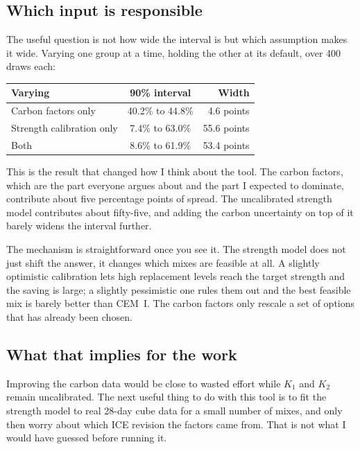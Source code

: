 \documentclass[11pt,a4paper]{article}
\begin{document}
\subsection{Which input is responsible}

The useful question is not how wide the interval is but which assumption makes it wide. Varying
one group at a time, holding the other at its default, over 400 draws each:

\begin{center}
\begin{tabular}{lcr}
\toprule
\textbf{Varying} & \textbf{90\% interval} & \textbf{Width} \\
\midrule
Carbon factors only       & 40.2\% to 44.8\% & 4.6 points \\
Strength calibration only & \phantom{0}7.4\% to 63.0\% & 55.6 points \\
Both                      & \phantom{0}8.6\% to 61.9\% & 53.4 points \\
\bottomrule
\end{tabular}
\end{center}

This is the result that changed how I think about the tool. The carbon factors, which are the
part everyone argues about and the part I expected to dominate, contribute about five percentage
points of spread. The uncalibrated strength model contributes about fifty-five, and adding the
carbon uncertainty on top of it barely widens the interval further.

The mechanism is straightforward once you see it. The strength model does not just shift the
answer, it changes which mixes are feasible at all. A slightly optimistic calibration lets high
replacement levels reach the target strength and the saving is large; a slightly pessimistic one
rules them out and the best feasible mix is barely better than CEM~I. The carbon factors only
rescale a set of options that has already been chosen.

\subsection{What that implies for the work}

Improving the carbon data would be close to wasted effort while $K_1$ and $K_2$ remain
uncalibrated. The next useful thing to do with this tool is to fit the strength model to real
28-day cube data for a small number of mixes, and only then worry about which ICE revision the
factors came from. That is not what I would have guessed before running it.
\end{document}

